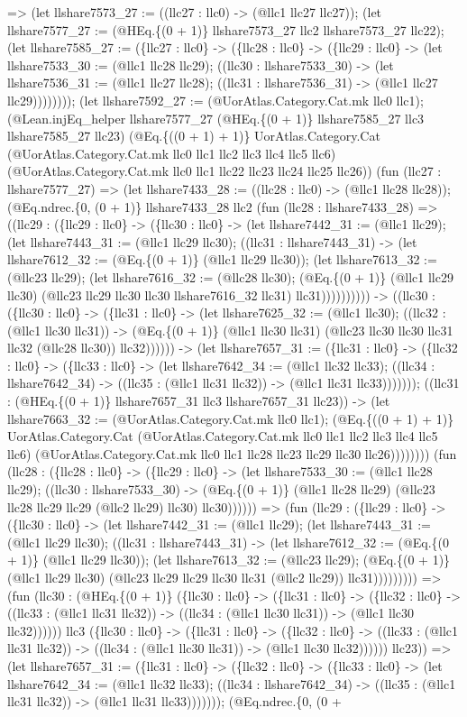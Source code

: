 \documentclass[11pt]{article}
\begin{document}
=> (let llshare7573\_27 := ((llc27 : llc0) -> (@llc1 llc27 llc27)); (let llshare7577\_27 := (@HEq.\{(0 + 1)\} llshare7573\_27 llc2 llshare7573\_27 llc22); (let llshare7585\_27 := (\{llc27 : llc0\} -> (\{llc28 : llc0\} -> (\{llc29 : llc0\} -> (let llshare7533\_30 := (@llc1 llc28 llc29); ((llc30 : llshare7533\_30) -> (let llshare7536\_31 := (@llc1 llc27 llc28); ((llc31 : llshare7536\_31) -> (@llc1 llc27 llc29)))))))); (let llshare7592\_27 := (@UorAtlas.Category.Cat.mk llc0 llc1); (@Lean.injEq\_helper llshare7577\_27 (@HEq.\{(0 + 1)\} llshare7585\_27 llc3 llshare7585\_27 llc23) (@Eq.\{((0 + 1) + 1)\} UorAtlas.Category.Cat (@UorAtlas.Category.Cat.mk llc0 llc1 llc2 llc3 llc4 llc5 llc6) (@UorAtlas.Category.Cat.mk llc0 llc1 llc22 llc23 llc24 llc25 llc26)) (fun (llc27 : llshare7577\_27) => (let llshare7433\_28 := ((llc28 : llc0) -> (@llc1 llc28 llc28)); (@Eq.ndrec.\{0, (0 + 1)\} llshare7433\_28 llc2 (fun (llc28 : llshare7433\_28) => ((llc29 : (\{llc29 : llc0\} -> (\{llc30 : llc0\} -> (let llshare7442\_31 := (@llc1 llc29); (let llshare7443\_31 := (@llc1 llc29 llc30); ((llc31 : llshare7443\_31) -> (let llshare7612\_32 := (@Eq.\{(0 + 1)\} (@llc1 llc29 llc30)); (let llshare7613\_32 := (@llc23 llc29); (let llshare7616\_32 := (@llc28 llc30); (@Eq.\{(0 + 1)\} (@llc1 llc29 llc30) (@llc23 llc29 llc30 llc30 llshare7616\_32 llc31) llc31)))))))))) -> ((llc30 : (\{llc30 : llc0\} -> (\{llc31 : llc0\} -> (let llshare7625\_32 := (@llc1 llc30); ((llc32 : (@llc1 llc30 llc31)) -> (@Eq.\{(0 + 1)\} (@llc1 llc30 llc31) (@llc23 llc30 llc30 llc31 llc32 (@llc28 llc30)) llc32)))))) -> (let llshare7657\_31 := (\{llc31 : llc0\} -> (\{llc32 : llc0\} -> (\{llc33 : llc0\} -> (let llshare7642\_34 := (@llc1 llc32 llc33); ((llc34 : llshare7642\_34) -> ((llc35 : (@llc1 llc31 llc32)) -> (@llc1 llc31 llc33))))))); ((llc31 : (@HEq.\{(0 + 1)\} llshare7657\_31 llc3 llshare7657\_31 llc23)) -> (let llshare7663\_32 := (@UorAtlas.Category.Cat.mk llc0 llc1); (@Eq.\{((0 + 1) + 1)\} UorAtlas.Category.Cat (@UorAtlas.Category.Cat.mk llc0 llc1 llc2 llc3 llc4 llc5 llc6) (@UorAtlas.Category.Cat.mk llc0 llc1 llc28 llc23 llc29 llc30 llc26)))))))) (fun (llc28 : (\{llc28 : llc0\} -> (\{llc29 : llc0\} -> (let llshare7533\_30 := (@llc1 llc28 llc29); ((llc30 : llshare7533\_30) -> (@Eq.\{(0 + 1)\} (@llc1 llc28 llc29) (@llc23 llc28 llc29 llc29 (@llc2 llc29) llc30) llc30)))))) => (fun (llc29 : (\{llc29 : llc0\} -> (\{llc30 : llc0\} -> (let llshare7442\_31 := (@llc1 llc29); (let llshare7443\_31 := (@llc1 llc29 llc30); ((llc31 : llshare7443\_31) -> (let llshare7612\_32 := (@Eq.\{(0 + 1)\} (@llc1 llc29 llc30)); (let llshare7613\_32 := (@llc23 llc29); (@Eq.\{(0 + 1)\} (@llc1 llc29 llc30) (@llc23 llc29 llc29 llc30 llc31 (@llc2 llc29)) llc31))))))))) => (fun (llc30 : (@HEq.\{(0 + 1)\} (\{llc30 : llc0\} -> (\{llc31 : llc0\} -> (\{llc32 : llc0\} -> ((llc33 : (@llc1 llc31 llc32)) -> ((llc34 : (@llc1 llc30 llc31)) -> (@llc1 llc30 llc32)))))) llc3 (\{llc30 : llc0\} -> (\{llc31 : llc0\} -> (\{llc32 : llc0\} -> ((llc33 : (@llc1 llc31 llc32)) -> ((llc34 : (@llc1 llc30 llc31)) -> (@llc1 llc30 llc32)))))) llc23)) => (let llshare7657\_31 := (\{llc31 : llc0\} -> (\{llc32 : llc0\} -> (\{llc33 : llc0\} -> (let llshare7642\_34 := (@llc1 llc32 llc33); ((llc34 : llshare7642\_34) -> ((llc35 : (@llc1 llc31 llc32)) -> (@llc1 llc31 llc33))))))); (@Eq.ndrec.\{0, (0 + 
\end{document}
